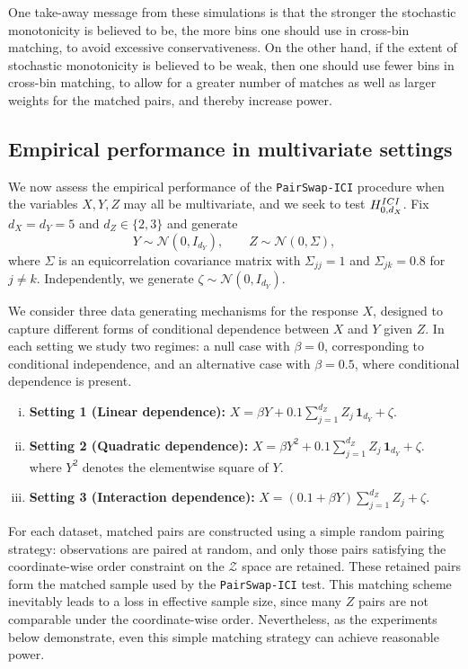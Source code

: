 \documentclass[12pt]{article}
\newcommand{\Zcal}{\mathcal{Z}}
\begin{document}
One take-away message from these simulations is that the stronger the stochastic monotonicity is believed to be, the more bins one should use in cross-bin matching, to avoid excessive conservativeness.  
On the other hand, if the extent of stochastic monotonicity is believed to be weak, then one should use fewer bins in cross-bin matching, to allow for a greater number of matches as well as larger weights for the matched pairs, and thereby increase power.


\subsection{Empirical performance in multivariate settings}\label{sec:mult_expt}

We now assess the empirical performance of the \texttt{PairSwap-ICI} procedure when the variables $X,Y,Z$ may all be multivariate, and we seek to test $H_{0,d_X}^{\textnormal{ICI}}$.  Fix $d_X = d_Y=5$ and $d_Z \in \{2,3\}$ and generate 
\[
Y\sim \mathcal{N}(0,I_{d_Y}), \qquad Z\sim \mathcal{N}(0,\Sigma),
\]
where $\Sigma$ is an equicorrelation covariance matrix with $\Sigma_{jj}=1$ and $\Sigma_{jk}=0.8$ for $j\neq k$. Independently, we generate $\zeta 
\sim \mathcal{N}(0,I_{d_Y})$. 

We consider three data generating mechanisms for the response $X$, designed to capture different forms of conditional dependence between $X$ and $Y$ given $Z$. In each setting we study two regimes: a null case with $\beta=0$, corresponding to conditional independence, and an alternative case with $\beta=0.5$, where conditional dependence is present.

\begin{enumerate}[(i)]
\item \textbf{Setting 1 (Linear dependence):} $X=\beta Y+0.1\sum_{j=1}^{d_Z}Z_j\,\mathbf{1}_{d_Y}+\zeta$.

\item \textbf{Setting 2 (Quadratic dependence):} $X=\beta Y^{2}+0.1\sum_{j=1}^{d_Z}Z_j\,\mathbf{1}_{d_Y}+\zeta$.
where $Y^{2}$ denotes the elementwise square of $Y$.

\item \textbf{Setting 3 (Interaction dependence):} $X=(0.1+\beta Y)\sum_{j=1}^{d_Z}Z_j+\zeta$.
\end{enumerate}

For each dataset, matched pairs are constructed using a simple random pairing strategy: observations are paired at random, and only those pairs satisfying the coordinate-wise order constraint on the $\Zcal$ space are retained. These retained pairs form the matched sample used by the \texttt{PairSwap-ICI} test. 
This matching scheme inevitably leads to a loss in effective sample size, since many $Z$ pairs are not comparable under the coordinate-wise order.  Nevertheless, as the experiments below demonstrate, even this simple matching strategy can achieve reasonable power.
\end{document}
